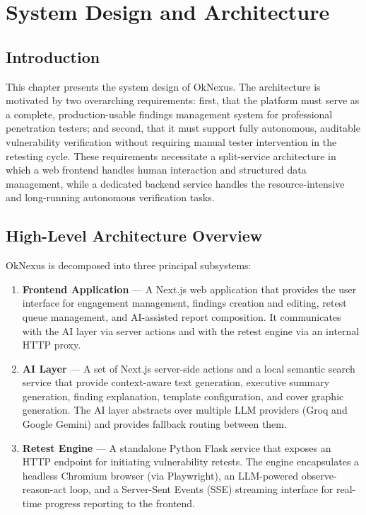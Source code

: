 \chapter{System Design and Architecture}

\section{Introduction}

This chapter presents the system design of OkNexus. The architecture is motivated by two overarching requirements: first, that the platform must serve as a complete, production-usable findings management system for professional penetration testers; and second, that it must support fully autonomous, auditable vulnerability verification without requiring manual tester intervention in the retesting cycle. These requirements necessitate a split-service architecture in which a web frontend handles human interaction and structured data management, while a dedicated backend service handles the resource-intensive and long-running autonomous verification tasks.

\section{High-Level Architecture Overview}

OkNexus is decomposed into three principal subsystems:

\begin{enumerate}
    \item \textbf{Frontend Application} --- A Next.js web application that provides the user interface for engagement management, findings creation and editing, retest queue management, and AI-assisted report composition. It communicates with the AI layer via server actions and with the retest engine via an internal HTTP proxy.

    \item \textbf{AI Layer} --- A set of Next.js server-side actions and a local semantic search service that provide context-aware text generation, executive summary generation, finding explanation, template configuration, and cover graphic generation. The AI layer abstracts over multiple LLM providers (Groq and Google Gemini) and provides fallback routing between them.

    \item \textbf{Retest Engine} --- A standalone Python Flask service that exposes an HTTP endpoint for initiating vulnerability retests. The engine encapsulates a headless Chromium browser (via Playwright), an LLM-powered observe-reason-act loop, and a Server-Sent Events (SSE) streaming interface for real-time progress reporting to the frontend.
\end{enumerate}

